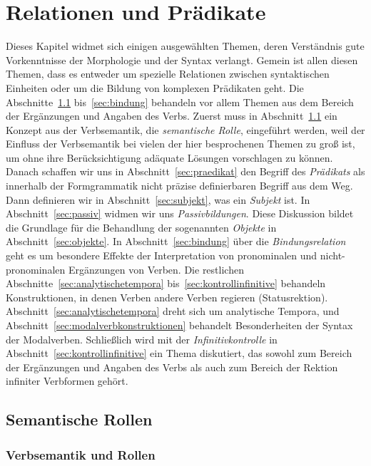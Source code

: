 \chapter{Relationen und Prädikate}

\label{sec:relationenpraedikate}

Dieses Kapitel widmet sich einigen ausgewählten Themen, deren Verständnis gute Vorkenntnisse der Morphologie und der Syntax verlangt.
Gemein ist allen diesen Themen, dass es entweder um spezielle Relationen zwischen syntaktischen Einheiten oder um die Bildung von komplexen Prädikaten geht.
Die Abschnitte~\ref{sec:semantischerollen} bis~\ref{sec:bindung} behandeln vor allem Themen aus dem Bereich der Ergänzungen und Angaben des Verbs.
Zuerst muss in Abschnitt~\ref{sec:semantischerollen} ein Konzept aus der Verbsemantik, die \textit{semantische Rolle}, eingeführt werden, weil der Einfluss der Verbsemantik bei vielen der hier besprochenen Themen zu groß ist, um ohne ihre Berücksichtigung adäquate Lösungen vorschlagen zu können.
Danach schaffen wir uns in Abschnitt~\ref{sec:praedikat} den Begriff des \textit{Prädikats} als innerhalb der Formgrammatik nicht präzise definierbaren Begriff aus dem Weg.
Dann definieren wir in Abschnitt~\ref{sec:subjekt}, was ein \textit{Subjekt} ist.
In Abschnitt~\ref{sec:passiv} widmen wir uns \textit{Passivbildungen}.
Diese Diskussion bildet die Grundlage für die Behandlung der sogenannten \textit{Objekte} in Abschnitt~\ref{sec:objekte}.
In Abschnitt~\ref{sec:bindung} über die \textit{Bindungsrelation} geht es um besondere Effekte der Interpretation von pronominalen und nicht-pronominalen Ergänzungen von Verben.
Die restlichen Abschnitte~\ref{sec:analytischetempora} bis~\ref{sec:kontrollinfinitive} behandeln Konstruktionen, in denen Verben andere Verben regieren (Statusrektion).
Abschnitt~\ref{sec:analytischetempora} dreht sich um analytische Tempora, und Abschnitt~\ref{sec:modalverbkonstruktionen} behandelt Besonderheiten der Syntax der Modalverben.
Schließlich wird mit der \textit{Infinitivkontrolle} in Abschnitt~\ref{sec:kontrollinfinitive} ein Thema diskutiert, das sowohl zum Bereich der Ergänzungen und Angaben des Verbs als auch zum Bereich der Rektion infiniter Verbformen gehört.

\section{Semantische Rollen}

\label{sec:semantischerollen}

\subsection{Verbsemantik und Rollen}

